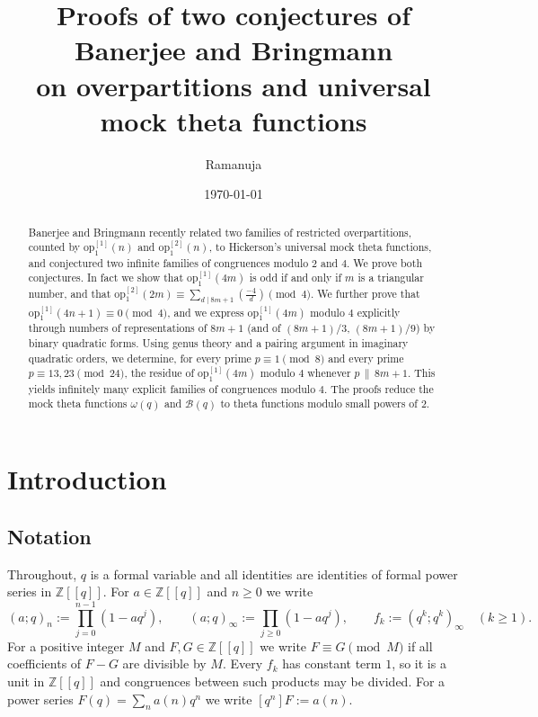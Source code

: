 \documentclass[11pt]{amsart}
\title[Overpartitions and universal mock theta functions]{Proofs of two conjectures of Banerjee and Bringmann\\ on overpartitions and universal mock theta functions}
\author{Ramanuja}
\date{\today}
\theoremstyle{definition}
\theoremstyle{remark}
\numberwithin{equation}{section}
\newcommand{\op}{\mathrm{op}}
\newcommand{\Z}{\mathbb{Z}}
\begin{document}
\begin{abstract}
Banerjee and Bringmann recently related two families of restricted overpartitions, counted by $\op_1^{[1]}(n)$ and $\op_1^{[2]}(n)$, to Hickerson's universal mock theta functions, and conjectured two infinite families of congruences modulo $2$ and $4$. We prove both conjectures. In fact we show that $\op_1^{[1]}(4m)$ is odd if and only if $m$ is a triangular number, and that $\op_1^{[2]}(2m)\equiv\sum_{d\mid 8m+1}\left(\frac{-4}{d}\right)\pmod 4$. We further prove that $\op_1^{[1]}(4n+1)\equiv 0\pmod 4$, and we express $\op_1^{[1]}(4m)$ modulo $4$ explicitly through numbers of representations of $8m+1$ (and of $(8m+1)/3$, $(8m+1)/9$) by binary quadratic forms. Using genus theory and a pairing argument in imaginary quadratic orders, we determine, for every prime $p\equiv 1\pmod 8$ and every prime $p\equiv 13,23\pmod{24}$, the residue of $\op_1^{[1]}(4m)$ modulo $4$ whenever $p\,\|\,8m+1$. This yields infinitely many explicit families of congruences modulo $4$. The proofs reduce the mock theta functions $\omega(q)$ and $\mathcal{B}(q)$ to theta functions modulo small powers of $2$.
\end{abstract}

\maketitle

\section{Introduction}\label{sec:intro}

\subsection{Notation}\label{subsec:notation}
Throughout, $q$ is a formal variable and all identities are identities of formal power series in $\Z[[q]]$. For $a\in\Z[[q]]$ and $n\ge 0$ we write
\[
(a;q)_n:=\prod_{j=0}^{n-1}(1-aq^j),\qquad (a;q)_\infty:=\prod_{j\ge 0}(1-aq^j),\qquad f_k:=(q^k;q^k)_\infty\quad(k\ge 1).
\]
For a positive integer $M$ and $F,G\in\Z[[q]]$ we write $F\equiv G\pmod M$ if all coefficients of $F-G$ are divisible by $M$. Every $f_k$ has constant term $1$, so it is a unit in $\Z[[q]]$ and congruences between such products may be divided. For a power series $F(q)=\sum_n a(n)q^n$ we write $[q^n]F:=a(n)$.
\end{document}
